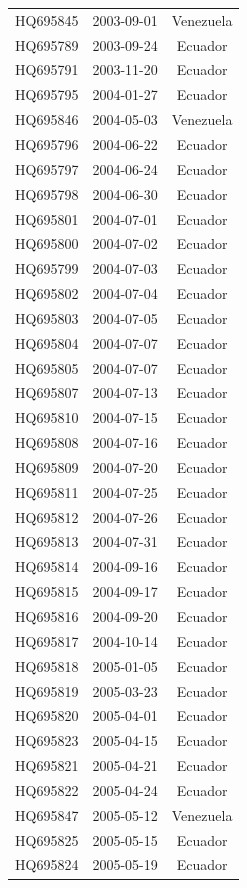 \documentclass[a4paper,10pt]{article}
\begin{document}
\begin{center}
\begin{longtable}{ccc}
HQ695845 & 2003-09-01 & Venezuela \\
HQ695789 & 2003-09-24 & Ecuador \\
HQ695791 & 2003-11-20 & Ecuador \\
HQ695795 & 2004-01-27 & Ecuador \\
HQ695846 & 2004-05-03 & Venezuela \\
HQ695796 & 2004-06-22 & Ecuador \\
HQ695797 & 2004-06-24 & Ecuador \\
HQ695798 & 2004-06-30 & Ecuador \\
HQ695801 & 2004-07-01 & Ecuador \\
HQ695800 & 2004-07-02 & Ecuador \\
HQ695799 & 2004-07-03 & Ecuador \\
HQ695802 & 2004-07-04 & Ecuador \\
HQ695803 & 2004-07-05 & Ecuador \\
HQ695804 & 2004-07-07 & Ecuador \\
HQ695805 & 2004-07-07 & Ecuador \\
HQ695807 & 2004-07-13 & Ecuador \\
HQ695810 & 2004-07-15 & Ecuador \\
HQ695808 & 2004-07-16 & Ecuador \\
HQ695809 & 2004-07-20 & Ecuador \\
HQ695811 & 2004-07-25 & Ecuador \\
HQ695812 & 2004-07-26 & Ecuador \\
HQ695813 & 2004-07-31 & Ecuador \\
HQ695814 & 2004-09-16 & Ecuador \\
HQ695815 & 2004-09-17 & Ecuador \\
HQ695816 & 2004-09-20 & Ecuador \\
HQ695817 & 2004-10-14 & Ecuador \\
HQ695818 & 2005-01-05 & Ecuador \\
HQ695819 & 2005-03-23 & Ecuador \\
HQ695820 & 2005-04-01 & Ecuador \\
HQ695823 & 2005-04-15 & Ecuador \\
HQ695821 & 2005-04-21 & Ecuador \\
HQ695822 & 2005-04-24 & Ecuador \\
HQ695847 & 2005-05-12 & Venezuela \\
HQ695825 & 2005-05-15 & Ecuador \\
HQ695824 & 2005-05-19 & Ecuador \\

\end{longtable}
\end{center}
\end{document}

